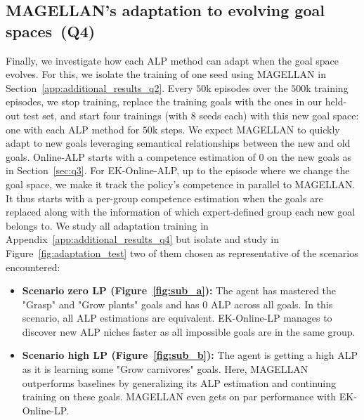 \documentclass{article}
\begin{document}
\subsection{MAGELLAN's adaptation to evolving goal spaces~(Q4)}
\label{sec:q4}
Finally, we investigate how each ALP method can adapt when the goal space evolves. For this, we isolate the training of one seed using MAGELLAN in Section~\ref{app:additional_results_q2}. Every $50$k episodes over the $500$k training episodes, we stop training, replace the training goals with the ones in our held-out test set, and start four trainings (with 8 seeds each) with this new goal space: one with each ALP method for $50$k steps. We expect MAGELLAN to quickly adapt to new goals leveraging semantical relationships between the new and old goals. Online-ALP starts with a competence estimation of $0$ on the new goals as in Section~\ref{sec:q3}. For EK-Online-ALP, up to the episode where we change the goal space, we make it track the policy's competence in parallel to MAGELLAN. It thus starts with a per-group competence estimation when the goals are replaced along with the information of which expert-defined group each new goal belongs to.  
We study all adaptation training in Appendix~\ref{app:additional_results_q4} but isolate and study in Figure~\ref{fig:adaptation_test} two of them chosen as representative of the scenarios encountered:
\begin{itemize}[noitemsep,topsep=0pt,parsep=0pt,partopsep=0pt]
    \item\textbf{Scenario zero LP (Figure~\ref{fig:sub_a}):} The agent has mastered the "Grasp" and "Grow plants" goals and has $0$ ALP across all goals. In this scenario, all ALP estimations are equivalent. EK-Online-LP manages to discover new ALP niches faster as all impossible goals are in the same group.
    \item\textbf{Scenario high LP (Figure~\ref{fig:sub_b}):} The agent is getting a high ALP as it is learning some "Grow carnivores" goals. Here, MAGELLAN outperforms baselines by generalizing its ALP estimation and continuing training on these goals. MAGELLAN even gets on par performance with EK-Online-LP.
\end{itemize}
\end{document}
